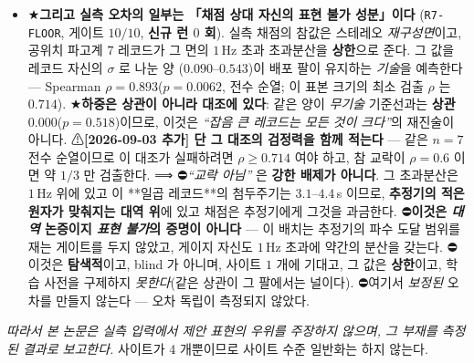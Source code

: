 \documentclass[11pt]{report}
\numberwithin{equation}{chapter}
\numberwithin{figure}{chapter}
\numberwithin{table}{chapter}
\begin{document}
\begin{itemize}
  \item ★\textbf{그리고 실측 오차의 일부는 「채점 상대 자신의 표현 불가 성분」이다}
        (\texttt{R7-FLOOR}, 게이트 $10/10$, \textbf{신규 런 $0$ 회}). 실측 채점의 참값은
        스테레오 \emph{재구성면}이고, 공위치 파고계 $7$ 레코드가 그 면의 $1$\,Hz 초과
        초과분산을 \textbf{상한}으로 준다. 그 값을 레코드 자신의 $\sigma$ 로 나눈 양
        ($0.090$--$0.543$)이 배포 팔이 유지하는 \emph{기술}을 예측한다 ---
        Spearman $\rho = 0.893$($p = 0.0062$, 전수 순열; 이 표본 크기의 최소 검출
        $\rho$ 는 $0.714$). ★\textbf{하중은 상관이 아니라 대조에 있다}: 같은 양이
        \emph{무기술} 기준선과는 \textbf{상관 $0.000$}($p = 0.518$)이므로, 이것은
        \emph{``잡음 큰 레코드는 모든 것이 크다''}의 재진술이 아니다.
        ⚠\textbf{[2026-09-03 추가] 단 그 대조의 검정력을 함께 적는다} --- 같은 $n=7$
        전수 순열이므로 이 대조가 실패하려면 $\rho \geq 0.714$ 여야 하고, 참 교락이
        $\rho = 0.6$ 이면 약 $1/3$ 만 검출한다. ⟹ ⛔\emph{``교락 아님''} 은
        \textbf{강한 배제가 아니다}. 그 초과분산은
        $1$\,Hz 위에 있고 이 **일곱 레코드**의 첨두주기는 $3.1$--$4.4$\,s 이므로,
        \textbf{추정기의 적은 원자가 맞춰지는 대역 위}에 있고 채점은 추정기에게 그것을
        과금한다. ⛔\textbf{이것은 \emph{대역} 논증이지 \emph{표현 불가}의 증명이 아니다} ---
        이 배치는 추정기의 파수 도달 범위를 재는 게이트를 두지 않았고, 게이지 자신도
        $1$\,Hz 초과에 약간의 분산을 갖는다. ⛔이것은 \textbf{탐색적}이고, blind 가 아니며,
        사이트 $1$ 개에 기대고, 그 값은 \textbf{상한}이고, 학습 사전을 구제하지
        \emph{못한다}(같은 상관이 그 팔에서는 널이다). ⛔여기서 \emph{보정된} 오차를
        만들지 않는다 --- 오차 독립이 측정되지 않았다.
\end{itemize}
\emph{따라서 본 논문은 실측 입력에서 제안 표현의 우위를 주장하지 않으며, 그 부재를
측정된 결과로 보고한다.} 사이트가 4 개뿐이므로 사이트 수준 일반화는 하지 않는다.
\end{document}
